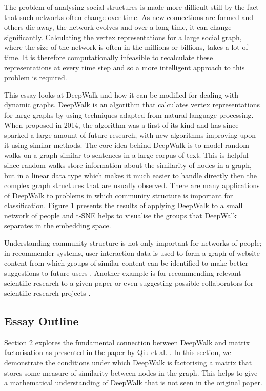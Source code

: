 \documentclass[a4paper]{article}
\begin{document}
The problem of analysing social structures is made more difficult still by the
fact that such networks often change over time. As new connections are formed
and others die away, the network evolves and over a long time, it can
change significantly. Calculating the vertex representations for a large social
graph, where the size of the network is often in the millions or billions, takes
a lot of time. It is therefore computationally infeasible to recalculate these
representations at every time step and so a more intelligent approach to this
problem is required.

This essay looks at DeepWalk \cite{deepwalk} and how it can be modified for dealing with dynamic
graphs. DeepWalk is an algorithm that calculates vertex representations for
large graphs by using techniques adapted from natural language processing. When proposed in 2014,
 the algorithm was a first of its kind and has since sparked a large amount of future research, with new
algorithms improving upon it using similar methods. The core idea behind DeepWalk is to model random walks
on a graph similar to sentences in a large corpus of text. This is helpful since random walks store information
about the similarity of nodes in a graph, but in a linear data type which makes it much easier to handle directly then the
complex graph structures that are usually observed. There are many applications of DeepWalk to problems in which community structure is important for classification. Figure 1 presents the results of applying DeepWalk to a small network of people and t-SNE helps to visualise the groups that DeepWalk separates in the embedding space.

Understanding community structure is not only important for networks of people; in recommender systems, user interaction data is used to form a graph of website content from which groups of similar content can be identified to make better suggestions to future users \cite{bai2020}. Another example is for recommending relevant scientific research to a given paper \cite{zhao2016} or even suggesting possible collaborators for scientific research projects \cite{xu2019}.


\subsection{Essay Outline}
Section 2 explores the fundamental connection between DeepWalk and
matrix factorisation as presented in the paper by Qiu et al. \cite{qiu2018}. In
this section, we demonstrate the conditions under which DeepWalk is factorising
a matrix that stores some measure of similarity between
nodes in the graph. This helps to give a mathematical understanding of DeepWalk that is not seen in the original paper.
\end{document}

